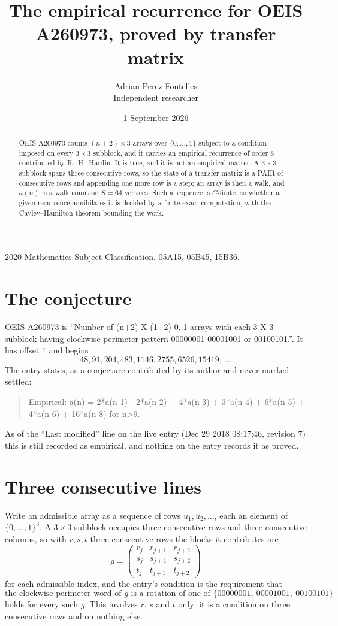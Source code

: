 \documentclass[11pt,a4paper]{article}
\title{The empirical recurrence for OEIS A260973, proved by transfer matrix}
\author{Adrian Perez Fontelles\\ \small Independent researcher}
\date{1 September 2026}
\theoremstyle{plain}
\theoremstyle{definition}
\begin{document}
\maketitle

\begin{abstract}
OEIS A260973 counts $(n+2)\times3$ arrays over $\{0,\dots,1\}$ subject to a condition imposed on
every $3\times3$ subblock, and it carries an empirical recurrence of order $8$
contributed by R.~H.~Hardin. It is true, and it is not an empirical matter. A $3\times3$
subblock spans three consecutive rows, so the state of a transfer matrix is a PAIR of
consecutive rows and appending one more row is a step; an array is then a walk, and
$a(n)$ is a walk count on $S=64$ vertices. Such a sequence is $C$-finite, so whether a given
recurrence annihilates it is decided by a finite exact computation, with the Cayley--Hamilton
theorem bounding the work.
\end{abstract}

\noindent\small 2020 Mathematics Subject Classification. 05A15, 05B45, 15B36.\normalsize

\section{The conjecture}

OEIS A260973 is ``Number of (n+2) X (1+2) 0..1 arrays with each 3 X 3 subblock having clockwise perimeter pattern 00000001 00001001 or 00100101.''. It has offset $1$ and begins
\[
48, 91, 204, 483, 1146, 2755, 6526, 15419,\ \dots
\]
The entry states, as a conjecture contributed by its author and never marked settled:
\begin{quote}
Empirical: a(n) = 2*a(n-1) - 2*a(n-2) + 4*a(n-3) + 3*a(n-4) + 6*a(n-5) + 4*a(n-6) + 16*a(n-8) for n>9.
\end{quote}
As of the ``Last modified'' line on the live entry (Dec 29 2018 08:17:46, revision 7) this is still
recorded as empirical, and nothing on the entry records it as proved.

\section{Three consecutive lines}

Write an admissible array as a sequence of rows $u_1,u_2,\dots$, each an element of
$\{0,\dots,1\}^{3}$. A $3\times3$ subblock occupies three consecutive rows and
three consecutive columns, so with $r,s,t$ three consecutive rows the blocks it
contributes are
\[
g=\begin{pmatrix}r_j&r_{j+1}&r_{j+2}\\ s_j&s_{j+1}&s_{j+2}\\ t_j&t_{j+1}&t_{j+2}\end{pmatrix}
\]
for each admissible index, and the entry's condition is the requirement that
\[
\text{the clockwise perimeter word of }g\text{ is a rotation of one of }\{00000001,\ 00001001,\ 00100101\}
\]
holds for every such $g$. This involves $r$, $s$ and $t$ only: it is a condition on
three consecutive rows and on nothing else.
\end{document}
